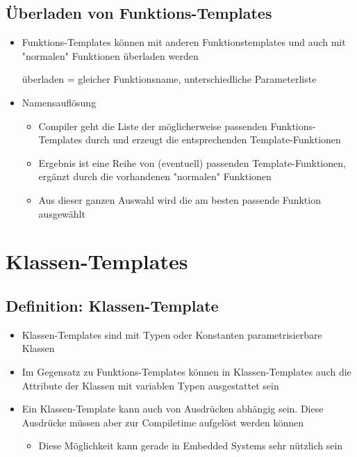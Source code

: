 \subsection{Überladen von Funktions-Templates}
\label{sec:Ueberladen von Funktions-Templates}
\begin{itemize}
	\item Funktions-Templates können mit anderen Funktionstemplates und auch mit "normalen" Funktionen überladen werden
	\begin{hinweis}
	überladen = gleicher Funktionsname, unterschiedliche Parameterliste
	\end{hinweis}
	\item Namensauflösung
	\begin{itemize}
		\item Compiler geht die Liste der möglicherweise passenden Funktions-Templates durch und erzeugt die entsprechenden Template-Funktionen
		\item Ergebnis ist eine Reihe von (eventuell) passenden Template-Funktionen, ergänzt durch die vorhandenen "normalen" Funktionen
		\item Aus dieser ganzen Auswahl wird die am besten passende Funktion ausgewählt
	\end{itemize}
\end{itemize}

\section{Klassen-Templates}
\label{sec:Klassen-Templates}

\subsection{Definition: Klassen-Template}
\label{sec:Definition: Klassen-Template}
\begin{itemize}
	\item Klassen-Templates sind mit Typen oder Konstanten parametrisierbare Klassen
	\item Im Gegensatz zu Funktions-Templates können in Klassen-Templates auch die Attribute der Klassen mit variablen Typen ausgestattet sein
	\item Ein Klassen-Template kann auch von Ausdrücken abhängig sein. Diese Ausdrücke müssen aber zur Compiletime aufgelöst werden können
	\begin{itemize}
		\item Diese Möglichkeit kann gerade in Embedded Systems sehr nützlich sein
	\end{itemize}
\end{itemize}

